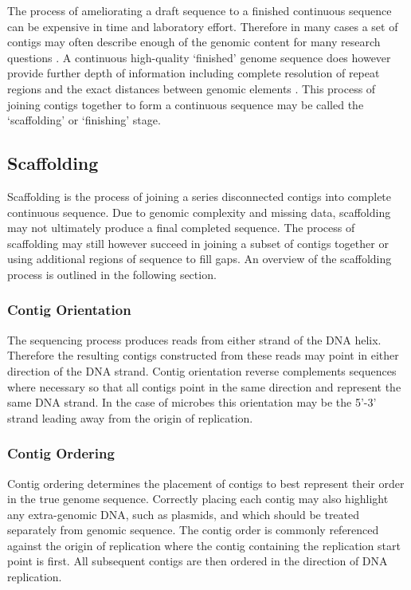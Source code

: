 \documentclass[10pt]{bmc_article}
\newenvironment{bmcformat}{\begin{raggedright}\baselineskip20pt\sloppy\setboolean{publ}{false}}{\end{raggedright}\baselineskip20pt\sloppy}
\begin{document}
\begin{bmcformat}
The process of ameliorating a draft sequence to a finished continuous sequence
can be expensive in time and laboratory effort. Therefore in many cases a set
of contigs may often describe enough of the genomic content for many research
questions \cite{branscomb2002}. A continuous high-quality `finished' genome
sequence does however provide further depth of information including complete
resolution of repeat regions and the exact distances between genomic elements
\cite{parkhill2002,fraser2002}. This process of joining contigs together to
form a continuous sequence may be called the `scaffolding' or `finishing'
stage. \pb

\subsection*{Scaffolding} %

Scaffolding is the process of joining a series disconnected contigs into
complete continuous sequence. Due to genomic complexity and missing data,
scaffolding may not ultimately produce a final completed sequence. The process
of scaffolding may still however succeed in joining a subset of contigs
together or using additional regions of sequence to fill gaps. An overview of
the scaffolding process is outlined in the following section.

\subsubsection*{Contig Orientation} %

The sequencing process produces reads from either strand of the DNA helix.
Therefore the resulting contigs constructed from these reads may point in
either direction of the DNA strand. Contig orientation reverse complements
sequences where necessary so that all contigs point in the same direction and
represent the same DNA strand. In the case of microbes this orientation may be
the 5'-3' strand leading away from the origin of replication.

\subsubsection*{Contig Ordering} %

Contig ordering determines the placement of contigs to best represent their
order in the true genome sequence. Correctly placing each contig may also
highlight any extra-genomic DNA, such as plasmids, and which should be treated
separately from genomic sequence. The contig order is commonly referenced
against the origin of replication where the contig containing the replication
start point is first. All subsequent contigs are then ordered in the direction
of DNA replication.


\end{bmcformat}
\end{document}
